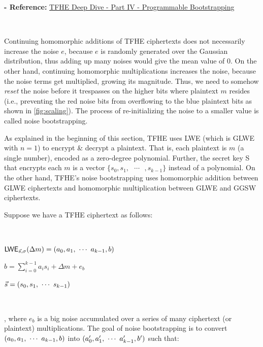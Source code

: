 \textbf{- Reference:} 
\href{https://www.zama.ai/post/tfhe-deep-dive-part-4}{TFHE Deep Dive - Part IV - Programmable Bootstrapping}~\cite{tfhe-4}

$ $

Continuing homomorphic additions of TFHE ciphertexts does not necessarily increase the noise $e$, because $e$ is randomly generated over the Gaussian distribution, thus adding up many noises would give the mean value of 0. On the other hand, continuing homomorphic multiplications increases the noise, because the noise terms get multiplied, growing its magnitude. Thus, we need to somehow \textit{reset} the noise before it trespasses on the higher bits where plaintext $m$ resides (i.e., preventing the red noise bits from overflowing to the blue plaintext bits as shown in \autoref{fig:scaling}). The process of re-initializing the noise to a smaller value is called noise bootstrapping.

As explained in the beginning of this section, TFHE uses LWE (which is GLWE with $n = 1$) to encrypt \& decrypt a plaintext. That is, each plaintext is $m$ (a single number), encoded as a zero-degree polynomial. Further, the secret key S that encrypts each $m$ is a vector $ \{s_0, s_1, \text{ } \cdots \text{ }, s_{k-1} \}$ instead of a polynomial. On the other hand, TFHE's noise bootstrapping uses homomorphic addition between GLWE ciphertexts and homomorphic multiplication between GLWE and GGSW ciphertexts.  


Suppose we have a TFHE ciphertext as follows: 

$ $

$\textsf{LWE}_{\vec{s}, \sigma}(\Delta m) = (a_0, a_1, \text{ } \text{$\cdots$} \text{ } a_{k-1}, b)$

$b = \sum\limits_{i=0}^{k-1} a_is_i + \Delta m + e_b$

$\vec{s} = (s_0, s_1, \text{ } \text{$\cdots$} \text{ } s_{k-1})$

$ $

, where $e_b$ is a big noise accumulated over a series of many ciphertext (or plaintext) multiplications. The goal of noise bootstrapping is to convert $(a_0, a_1, \text{ } \text{$\cdots$} \text{ } a_{k-1}, b)$ into $(a_0', a_1', \text{ } \text{$\cdots$} \text{ } a_{k-1}', b')$ such that: 

